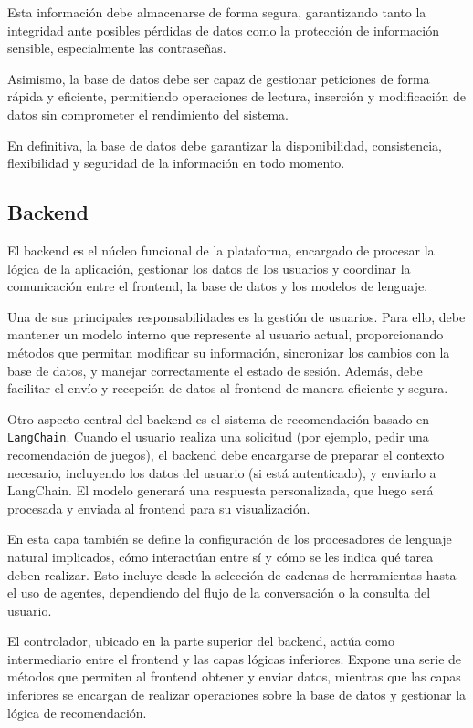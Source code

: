 Esta información debe almacenarse de forma segura, garantizando tanto la integridad ante posibles pérdidas de datos como la protección de información sensible, especialmente las contraseñas.

Asimismo, la base de datos debe ser capaz de gestionar peticiones de forma rápida y eficiente, permitiendo operaciones de lectura, inserción y modificación de datos sin comprometer el rendimiento del sistema.

En definitiva, la base de datos debe garantizar la disponibilidad, consistencia, flexibilidad y seguridad de la información en todo momento.


\subsection{Backend}

El backend es el núcleo funcional de la plataforma, encargado de procesar la lógica de la aplicación, gestionar los datos de los usuarios y coordinar la comunicación entre el frontend, la base de datos y los modelos de lenguaje.

Una de sus principales responsabilidades es la gestión de usuarios. Para ello, debe mantener un modelo interno que represente al usuario actual, proporcionando métodos que permitan modificar su información, sincronizar los cambios con la base de datos, y manejar correctamente el estado de sesión. Además, debe facilitar el envío y recepción de datos al frontend de manera eficiente y segura.

Otro aspecto central del backend es el sistema de recomendación basado en \texttt{LangChain}. Cuando el usuario realiza una solicitud (por ejemplo, pedir una recomendación de juegos), el backend debe encargarse de preparar el contexto necesario, incluyendo los datos del usuario (si está autenticado), y enviarlo a LangChain. El modelo generará una respuesta personalizada, que luego será procesada y enviada al frontend para su visualización.

En esta capa también se define la configuración de los procesadores de lenguaje natural implicados, cómo interactúan entre sí y cómo se les indica qué tarea deben realizar. Esto incluye desde la selección de cadenas de herramientas hasta el uso de agentes, dependiendo del flujo de la conversación o la consulta del usuario.

El controlador, ubicado en la parte superior del backend, actúa como intermediario entre el frontend y las capas lógicas inferiores. Expone una serie de métodos que permiten al frontend obtener y enviar datos, mientras que las capas inferiores se encargan de realizar operaciones sobre la base de datos y gestionar la lógica de recomendación.

